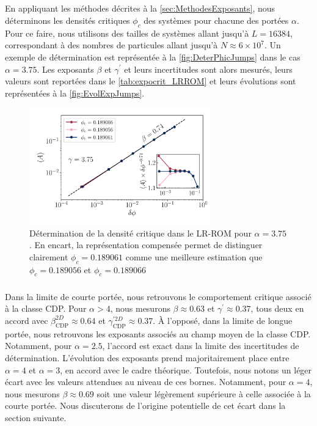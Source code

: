 \subparagraph{}En appliquant les méthodes décrites à la \autoref{sec:MethodesExposants}, nous déterminons les densités critiques $\phi_c$ des systèmes pour chacune des portées $\alpha$. Pour ce faire, nous utilisons des tailles de systèmes allant jusqu'à $L=16384$, correspondant à des nombres de particules allant jusqu'à $N\approx 6\times 10^7$. Un exemple de détermination est représentée à la \autoref{fig:DeterPhicJumps} dans le cas $\alpha = 3.75$. Les exposants $\beta$ et $\gamma^\prime$ et leurs incertitudes sont alors mesurés, leurs valeurs sont reportées dans le \autoref{tab:expocrit_LRROM} et leurs évolutions sont représentées à la \autoref{fig:EvolExpJumps}.

\begin{figure}[h]
	\centering
	\includegraphics[width=0.7\textwidth]{Chapitre2/Figures/Exposants/Deter_phic_gamma375_LRROM.pdf}
	\caption{Détermination de la densité critique dans le LR-ROM pour $\alpha=3.75$. En encart, la représentation compensée permet de distinguer clairement $\phi_c = 0.189061$ comme une meilleure estimation que $\phi_c = 0.189056$ et $\phi_c = 0.189066$}
	\label{fig:DeterPhicJumps}
\end{figure}

\subparagraph{}Dans la limite de courte portée, nous retrouvons le comportement critique associé à la classe CDP. Pour $\alpha > 4$, nous mesurons $\beta\approx 0.63$ et $\gamma^\prime \approx 0.37$, tous deux en accord avec $\beta_\text{CDP}^{2D}\approx 0.64$ et $\gamma_\text{CDP}^{\prime 2D}\approx 0.37$. \`A l'opposé, dans la limite de longue portée, nous retrouvons les exposants associés au champ moyen de la classe CDP. Notamment, pour $\alpha = 2.5$, l'accord est exact dans la limite des incertitudes de détermination. L'évolution des exposants prend majoritairement place entre $\alpha = 4$ et $\alpha = 3$, en accord avec le cadre théorique. Toutefois, nous notons un léger écart avec les valeurs attendues au niveau de ces bornes. Notamment, pour $\alpha = 4$, nous mesurons $\beta \approx 0.69$ soit une valeur légèrement supérieure à celle associée à la courte portée. Nous discuterons de l'origine potentielle de cet écart dans la section suivante.

